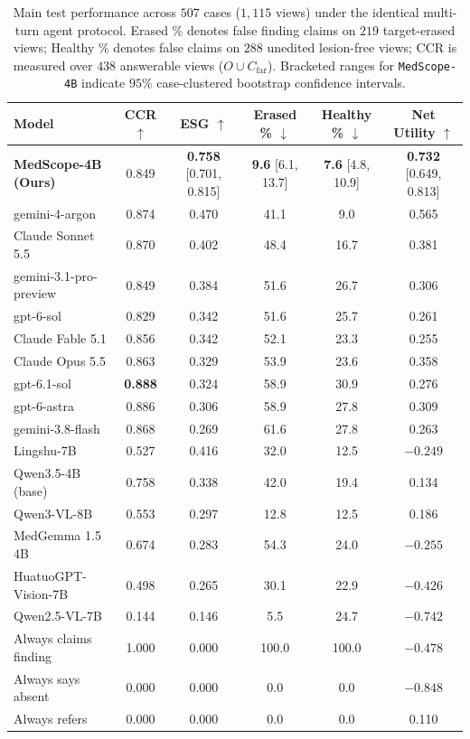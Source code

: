 \documentclass{article} %
\begin{document}
\begin{table}[t]
\caption{Main test performance across $507$ cases ($1,115$ views) under the identical multi-turn agent protocol. Erased \% denotes false finding claims on $219$ target-erased views; Healthy \% denotes false claims on $288$ unedited lesion-free views; CCR is measured over $438$ answerable views ($O \cup C_{\text{far}}$). Bracketed ranges for \texttt{MedScope-4B} indicate $95\%$ case-clustered bootstrap confidence intervals.}
\label{tab:main_results}
\vspace{-0.2cm}
\begin{center}
\small
\begin{tabular}{lccccc}
\toprule
\textbf{Model} & \textbf{CCR} $\uparrow$ & \textbf{ESG} $\uparrow$ & \textbf{Erased \%} $\downarrow$ & \textbf{Healthy \%} $\downarrow$ & \textbf{Net Utility} $\uparrow$ \\
\midrule
\textbf{MedScope-4B (Ours)} & 0.849 & \textbf{0.758} [0.701, 0.815] & \textbf{9.6} [6.1, 13.7] & \textbf{7.6} [4.8, 10.9] & \textbf{0.732} [0.649, 0.813] \\
\midrule
gemini-4-argon & 0.874 & 0.470 & 41.1 & 9.0 & 0.565 \\
Claude Sonnet 5.5 & 0.870 & 0.402 & 48.4 & 16.7 & 0.381 \\
gemini-3.1-pro-preview & 0.849 & 0.384 & 51.6 & 26.7 & 0.306 \\
gpt-6-sol & 0.829 & 0.342 & 51.6 & 25.7 & 0.261 \\
Claude Fable 5.1 & 0.856 & 0.342 & 52.1 & 23.3 & 0.255 \\
Claude Opus 5.5 & 0.863 & 0.329 & 53.9 & 23.6 & 0.358 \\
gpt-6.1-sol & \textbf{0.888} & 0.324 & 58.9 & 30.9 & 0.276 \\
gpt-6-astra & 0.886 & 0.306 & 58.9 & 27.8 & 0.309 \\
gemini-3.8-flash & 0.868 & 0.269 & 61.6 & 27.8 & 0.263 \\
\midrule
Lingshu-7B & 0.527 & 0.416 & 32.0 & 12.5 & $-0.249$ \\
Qwen3.5-4B (base) & 0.758 & 0.338 & 42.0 & 19.4 & 0.134 \\
Qwen3-VL-8B & 0.553 & 0.297 & 12.8 & 12.5 & 0.186 \\
MedGemma 1.5 4B & 0.674 & 0.283 & 54.3 & 24.0 & $-0.255$ \\
HuatuoGPT-Vision-7B & 0.498 & 0.265 & 30.1 & 22.9 & $-0.426$ \\
Qwen2.5-VL-7B & 0.144 & 0.146 & 5.5 & 24.7 & $-0.742$ \\
\midrule
Always claims finding & 1.000 & 0.000 & 100.0 & 100.0 & $-0.478$ \\
Always says absent & 0.000 & 0.000 & 0.0 & 0.0 & $-0.848$ \\
Always refers & 0.000 & 0.000 & 0.0 & 0.0 & 0.110 \\
\bottomrule
\end{tabular}
\end{center}
\vspace{-0.2cm}
\end{table}
\end{document}
